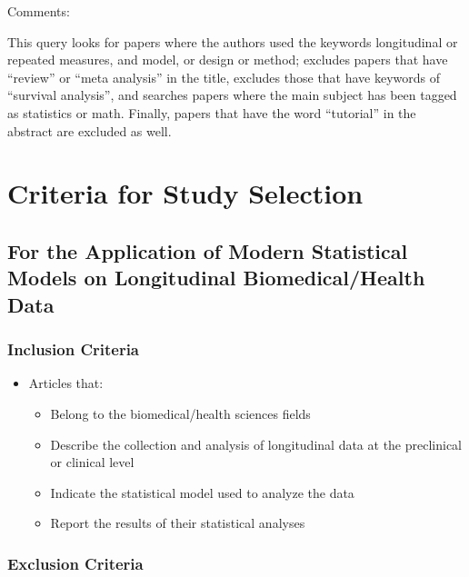 \documentclass[
]{article}
\begin{document}
Comments:

This query looks for papers where the authors used the keywords
longitudinal or repeated measures, and model, or design or method;
excludes papers that have ``review'' or ``meta analysis'' in the title,
excludes those that have keywords of ``survival analysis'', and searches
papers where the main subject has been tagged as statistics or math.
Finally, papers that have the word ``tutorial'' in the abstract are
excluded as well.

\hypertarget{criteria-for-study-selection}{%
\section{Criteria for Study
Selection}\label{criteria-for-study-selection}}

\hypertarget{for-the-application-of-modern-statistical-models-on-longitudinal-biomedicalhealth-data}{%
\subsection{For the Application of Modern Statistical Models on
Longitudinal Biomedical/Health
Data}\label{for-the-application-of-modern-statistical-models-on-longitudinal-biomedicalhealth-data}}

\hypertarget{inclusion-criteria}{%
\subsubsection{Inclusion Criteria}\label{inclusion-criteria}}

\begin{itemize}
\item
  Articles that:

  \begin{itemize}
  \item
    Belong to the biomedical/health sciences fields
  \item
    Describe the collection and analysis of longitudinal data at the
    preclinical or clinical level
  \item
    Indicate the statistical model used to analyze the data
  \item
    Report the results of their statistical analyses
  \end{itemize}
\end{itemize}

\hypertarget{exclusion-criteria}{%
\subsubsection{Exclusion Criteria}\label{exclusion-criteria}}
\end{document}
